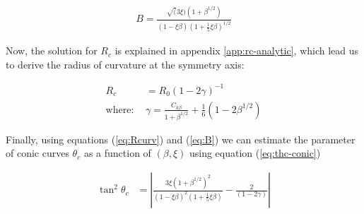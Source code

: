 \begin{align}
B = \frac{\sqrt(3\xi)\left(1+\beta^{1/2}\right)}{(1-\xi\beta)\left(1+\frac{1}{5}\xi\beta\right)^{1/2}}
\label{eq:B}
\end{align}

Now, the solution for $R_c$ is explained in appendix \ref{app:rc-analytic},
which lead us to derive the radius of curvature at the symmetry axis:

\begin{align}
R_c &= R_0\left(1-2\gamma\right)^{-1} \label{eq:Rcurv} \\
\mathrm{where:~} & \gamma = \frac{C_{k\beta}}{1+\beta^{1/2}}+\frac{1}{6}(1-2\beta^{1/2})
\end{align}

Finally, using equations (\ref{eq:Rcurv}) and (\ref{eq:B}) we can estimate the parameter of
conic curves $\theta_c$ as a function of $(\beta,\xi)$ using equation (\ref{eq:thc-conic})

\begin{align}
\tan^2\theta_c &= \left| \frac{3\xi\left(1+\beta^{1/2}\right)^2}{\left(1-\xi\beta\right)^2\left(1+\frac{1}{5}\xi\beta\right)}-\frac{2}{\left(1-2\gamma\right)}\right| 
\label{eq:thc-CRW}
\end{align}

